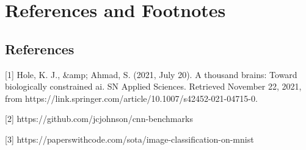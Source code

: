 \documentclass[journal]{IEEEtai}
\begin{document}
\section*{References and Footnotes}

\subsection{References}
[1] Hole, K. J., \&amp; Ahmad, S. (2021, July 20). A thousand brains: Toward biologically constrained ai. SN Applied Sciences. Retrieved November 22, 2021, from https://link.springer.com/article/10.1007/s42452-021-04715-0. 

[2] https://github.com/jcjohnson/cnn-benchmarks
 
[3] https://paperswithcode.com/sota/image-classification-on-mnist
\end{document}
